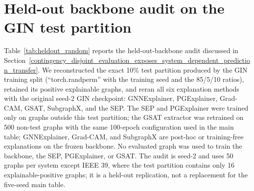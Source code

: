 \section{Held-out backbone audit on the GIN test partition}\label{appendix:heldout_random}
\setcounter{table}{0}

Table~\ref{tab:heldout_random} reports the held-out-backbone audit discussed in Section~\ref{contingency_disjoint_evaluation_exposes_system_dependent_prediction_transfer}. We reconstructed the exact 10\% test partition produced by the GIN training split (``torch.randperm'' with the training seed and the 85/5/10 ratios), retained its positive explainable graphs, and reran all six explanation methods with the original seed-2 GIN checkpoint: GNNExplainer, PGExplainer, Grad-CAM, GSAT, SubgraphX, and the SEP. The SEP and PGExplainer were trained only on graphs outside this test partition; the GSAT extractor was retrained on 500 non-test graphs with the same 100-epoch configuration used in the main table; GNNExplainer, Grad-CAM, and SubgraphX are post-hoc or training-free explanations on the frozen backbone. No evaluated graph was used to train the backbone, the SEP, PGExplainer, or GSAT. The audit is seed-2 and uses 50 graphs per system except IEEE 39, where the test partition contains only 16 explainable-positive graphs; it is a held-out replication, not a replacement for the five-seed main table.

